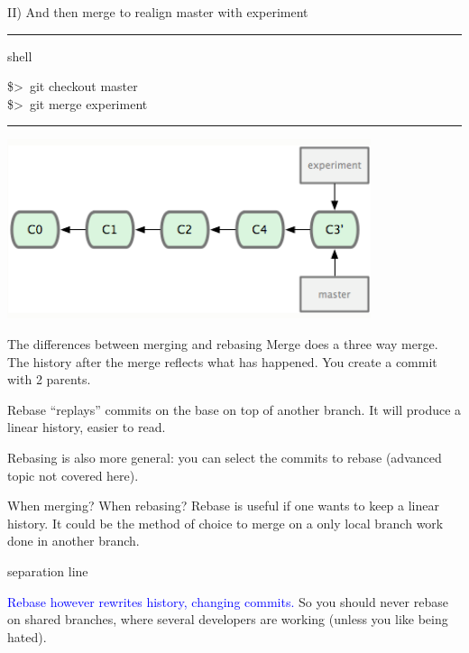 \documentclass[hyperref={colorlinks}]{beamer}
\newenvironment{shell}{%
\footnotesize\flushleft\hrule height 0.1ex
\tt\begin{beamercolorbox}[sep=1ex,left]{shell}%
}{%
\end{beamercolorbox}
\hrule height 0.1ex
\endflushleft\par
}
\newcommand*{\psone}[1][ant]{\$>~}
\newcommand{\titleline}[1][0.025cm]{%
\begin{beamercolorbox}[wd=\paperwidth,ht=#1,center]{separation line}%
\end{beamercolorbox}%
}
\begin{document}
\begin{frame}{II) And then  merge to realign master with experiment}
\begin{shell}
\psone git checkout master\\
\psone git merge experiment
\end{shell}
\begin{center}
\includegraphics[width=0.8\textwidth]{figures/rebase2}\\
\end{center}
\end{frame}

\begin{frame}{The differences between merging and rebasing}
Merge does a three way merge. The history after the merge reflects what has happened. 
You create a commit with \alert{2 parents}.
\medskip

Rebase ``replays'' commits on the base on top of another branch. It will produce a \alert{linear history}, easier to read.
\medskip

Rebasing is also more general: you can select the commits to rebase (advanced topic not covered here).
\end{frame}

\begin{frame}{When merging? When rebasing?}
Rebase is useful if one wants to keep a linear history. It could be the method of choice to merge on a \alert{only local} branch work done in another branch.
\medskip
\titleline

\textcolor{blue}{Rebase however rewrites history, changing commits.} So 
\alert{you should never rebase on shared branches, where several developers are working (unless you like being hated).}
\end{frame}
\end{document}
